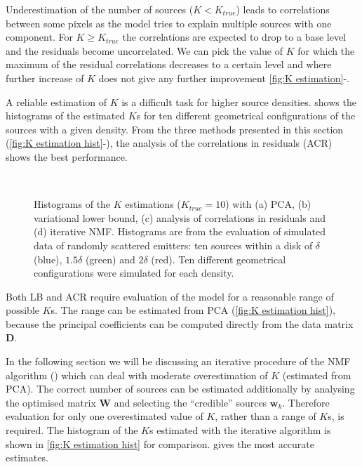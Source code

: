 \begin{enumerate}
Underestimation of the number of sources ($K<K_{true}$) leads to correlations between some pixels as the model tries to explain multiple sources with one component. For $K\geq K_{true}$ the correlations are expected to drop to a base level and the residuals become uncorrelated. We can pick the value of $K$ for which the maximum of the residual correlations decreases to a certain level and where further increase of $K$ does not give any further improvement \autoref{fig:K estimation}\gggg-\iii.
\end{enumerate}

A reliable estimation of $K$ is a difficult task for higher source densities.  shows the histograms of the estimated $K$s for ten different geometrical configurations of the sources with a given density. From the three methods presented in this section  (\autoref{fig:K estimation hist}\aaa-\ccc), the analysis of the correlations in residuals (ACR) shows the best performance.
%
\begin{figure}[!hbt]
	\newcommand{\sizef}{.4}		
	\centering
	\\
	\caption{Histograms of the $K$ estimations ($K_{true}=10$) with (a) PCA, (b) variational lower bound, (c) analysis of correlations in residuals and (d) iterative NMF. Histograms are from the evaluation of simulated data of randomly scattered emitters: ten sources within a disk of $\delta$ (blue), $1.5\delta$ (green) and $2\delta$ (red). Ten different geometrical configurations were simulated for each density.}
	\label{fig:K estimation hist}
\end{figure}

Both LB and ACR require evaluation of the model for a reasonable range of possible $K$s. The range can be estimated from PCA  (\autoref{fig:K estimation hist}\ccc), because the principal coefficients can be computed directly from the data matrix $\bm{D}$.

In the following section we will be discussing an iterative procedure of the NMF algorithm (\inmf{}) which can deal with moderate overestimation of $K$  (estimated from PCA). The correct number of sources can be estimated additionally by analysing the optimised matrix $\bm{W}$ and selecting the ``credible'' sources $\bm{w}_k$. Therefore evaluation for only one overestimated value of $K$, rather than a range of $K$s, is required. The histogram of the $K$s estimated with the iterative algorithm is shown in  \autoref{fig:K estimation hist}\ddd{} for comparison. \inmf{} gives the most accurate estimates. 

